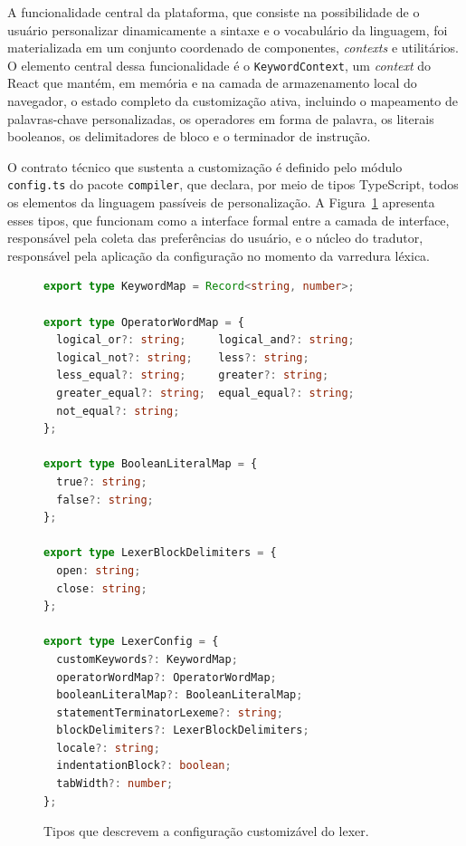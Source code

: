 A funcionalidade central da plataforma, que consiste na possibilidade de o usuário personalizar dinamicamente a sintaxe e o vocabulário da linguagem, foi materializada em um conjunto coordenado de componentes, \textit{contexts} e utilitários. O elemento central dessa funcionalidade é o \texttt{KeywordContext}, um \textit{context} do React que mantém, em memória e na camada de armazenamento local do navegador, o estado completo da customização ativa, incluindo o mapeamento de palavras-chave personalizadas, os operadores em forma de palavra, os literais booleanos, os delimitadores de bloco e o terminador de instrução.

O contrato técnico que sustenta a customização é definido pelo módulo \texttt{config.ts} do pacote \texttt{compiler}, que declara, por meio de tipos TypeScript, todos os elementos da linguagem passíveis de personalização. A Figura~\ref{lst:lexer-config} apresenta esses tipos, que funcionam como a interface formal entre a camada de interface, responsável pela coleta das preferências do usuário, e o núcleo do tradutor, responsável pela aplicação da configuração no momento da varredura léxica.

\begin{figure}[htbp]
\centering
\caption{Tipos que descrevem a configuração customizável do lexer.}
\label{lst:lexer-config}
\begin{lstlisting}[language=typescript]
export type KeywordMap = Record<string, number>;

export type OperatorWordMap = {
  logical_or?: string;     logical_and?: string;
  logical_not?: string;    less?: string;
  less_equal?: string;     greater?: string;
  greater_equal?: string;  equal_equal?: string;
  not_equal?: string;
};

export type BooleanLiteralMap = {
  true?: string;
  false?: string;
};

export type LexerBlockDelimiters = {
  open: string;
  close: string;
};

export type LexerConfig = {
  customKeywords?: KeywordMap;
  operatorWordMap?: OperatorWordMap;
  booleanLiteralMap?: BooleanLiteralMap;
  statementTerminatorLexeme?: string;
  blockDelimiters?: LexerBlockDelimiters;
  locale?: string;
  indentationBlock?: boolean;
  tabWidth?: number;
};
\end{lstlisting}
\end{figure}

